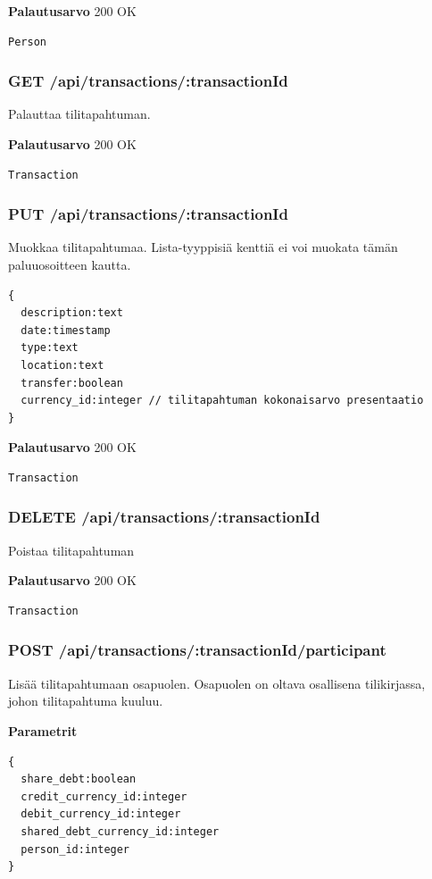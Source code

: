 \documentclass[a4paper,parskip=half]{scrartcl}
\begin{document}
\textbf{Palautusarvo}
200 OK
\begin{Verbatim}
Person
\end{Verbatim}

\subsubsection{GET /api/transactions/:transactionId}

Palauttaa tilitapahtuman.

\textbf{Palautusarvo}
200 OK
\begin{Verbatim}
Transaction
\end{Verbatim}

\subsubsection{PUT /api/transactions/:transactionId}

Muokkaa tilitapahtumaa. Lista-tyyppisiä kenttiä ei voi muokata tämän
paluuosoitteen kautta.

\begin{Verbatim}
{
  description:text
  date:timestamp
  type:text
  location:text
  transfer:boolean
  currency_id:integer // tilitapahtuman kokonaisarvo presentaatio
}
\end{Verbatim}

\textbf{Palautusarvo}
200 OK
\begin{Verbatim}
Transaction
\end{Verbatim}

\subsubsection{DELETE /api/transactions/:transactionId}

Poistaa tilitapahtuman

\textbf{Palautusarvo}
200 OK
\begin{Verbatim}
Transaction
\end{Verbatim}

\subsubsection{POST /api/transactions/:transactionId/participant}

Lisää tilitapahtumaan osapuolen. Osapuolen on oltava osallisena tilikirjassa,
johon tilitapahtuma kuuluu.

\textbf{Parametrit}
\begin{Verbatim}
{
  share_debt:boolean
  credit_currency_id:integer
  debit_currency_id:integer
  shared_debt_currency_id:integer
  person_id:integer
}
\end{Verbatim}
\end{document}
